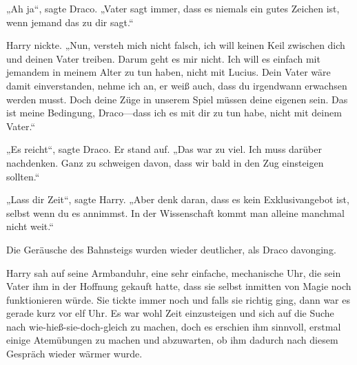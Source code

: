 „Ah ja“, sagte Draco. „Vater sagt immer, dass es niemals ein gutes Zeichen ist, wenn jemand das zu dir sagt.“

Harry nickte. „Nun, versteh mich nicht falsch, ich will keinen Keil zwischen dich und deinen Vater treiben. Darum geht es mir nicht. Ich will es einfach mit jemandem in meinem Alter zu tun haben, nicht mit Lucius. Dein Vater wäre damit einverstanden, nehme ich an, er weiß auch, dass du irgendwann erwachsen werden musst. Doch deine Züge in unserem Spiel müssen deine eigenen sein. Das ist meine Bedingung, Draco—dass ich es mit dir zu tun habe, nicht mit deinem Vater.“

„Es reicht“, sagte Draco. Er stand auf. „Das war zu viel. Ich muss darüber nachdenken. Ganz zu schweigen davon, dass wir bald in den Zug einsteigen sollten.“

„Lass dir Zeit“, sagte Harry. „Aber denk daran, dass es kein Exklusivangebot ist, selbst wenn du es annimmst. In der Wissenschaft kommt man alleine manchmal nicht weit.“

Die Geräusche des Bahnsteigs wurden wieder deutlicher, als Draco davonging.

Harry sah auf seine Armbanduhr, eine sehr einfache, mechanische Uhr, die sein Vater ihm in der Hoffnung gekauft hatte, dass sie selbst inmitten von Magie noch funktionieren würde. Sie tickte immer noch und falls sie richtig ging, dann war es gerade kurz vor elf Uhr. Es war wohl Zeit einzusteigen und sich auf die Suche nach wie-hieß-sie-doch-gleich zu machen, doch es erschien ihm sinnvoll, erstmal einige Atemübungen zu machen und abzuwarten, ob ihm dadurch nach diesem Gespräch wieder wärmer wurde.

